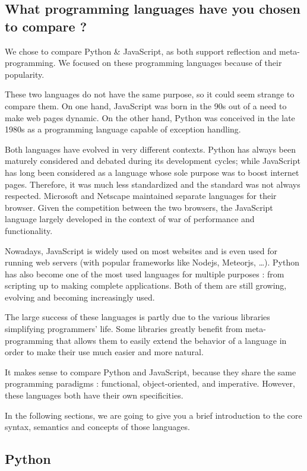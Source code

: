 \documentclass[a4paper,10pt]{article}
\begin{document}
\subsection{What programming languages have you chosen to compare ?}

We chose to compare Python \& JavaScript, as both support reflection and meta-programming.
We focused on these programming languages because of their popularity.

These two languages do not have the same purpose, so it could seem strange to compare them.
On one hand, JavaScript was born in the 90s out of a need to make web pages dynamic.
On the other hand, Python was conceived in the late 1980s as a programming language capable of exception handling.

Both languages have evolved in very different contexts.
Python has always been maturely considered and debated during its development cycles; while JavaScript has long been considered as a language whose sole purpose was to boost internet pages.
Therefore, it was much less standardized and the standard was not always respected.
Microsoft and Netscape maintained separate languages for their browser.
Given the competition between the two browsers, the JavaScript language largely developed in the context of war of performance and functionality.

Nowadays, JavaScript is widely used on most websites and is even used for running web servers (with popular frameworks like Nodejs, Meteorjs, \dots).
Python has also become one of the most used languages for multiple purposes : from scripting up to making complete applications.
Both of them are still growing, evolving and becoming increasingly used.

The large success of these languages is partly due to the various libraries simplifying  programmers' life.
Some libraries greatly benefit from meta-programming that allows them to easily extend the behavior of a language in order to make their use much easier and more natural.

It makes sense to compare Python and JavaScript, because they share the same programming paradigms : functional, object-oriented, and imperative.
However, these languages both have their own specificities.

In the following sections, we are going to give you a brief introduction to the core syntax, semantics and concepts of those languages.

\subsection{Python}
\setpy
\end{document}

